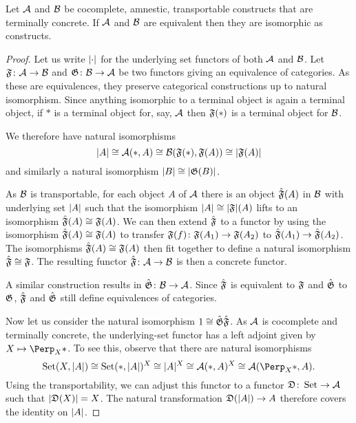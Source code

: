 \documentclass[%
12pt,%
arxiv,%
defaults
]{myclass}
\begin{document}
\begin{proposition}
Let \(\mathcal{A}\) and \(\mathcal{B}\) be cocomplete, amnestic, transportable constructs that are terminally concrete.
If \(\mathcal{A}\) and \(\mathcal{B}\) are equivalent then they are isomorphic as constructs.
\end{proposition}

\begin{proof}
Let us write \(\lvert \cdot \rvert\) for the underlying set functors of both \(\mathcal{A}\) and \(\mathcal{B}\).
Let \(\func{F} \colon \m{A} \to \m{B}\) and \(\func{G} \colon \m{B} \to \m{A}\) be two functors giving an equivalence of categories.
As these are equivalences, they preserve categorical constructions up to natural isomorphism.
Since anything isomorphic to a terminal object is again a terminal object, if \(*\) is a terminal object for, say, \(\mathcal{A}\) then \(\func{F}(*)\) is a terminal object for \(\mathcal{B}\).

We therefore have natural isomorphisms
%
\[
  \sabs{A} \cong \m{A}(*, A) \cong \m{B}(\func{F}(*), \func{F}(A)) \cong \sabs{\func{F}(A)}
\]
%
and similarly a natural isomorphism \(\sabs{B} \cong \sabs{\func{G}(B)}\).

As \(\mathcal{B}\) is transportable, for each object \(A\) of \(\mathcal{A}\) there is an object \(\hat{\func{F}}(A)\) in \(\mathcal{B}\) with underlying set \(\lvert A \rvert\) such that the isomorphism \(\sabs{A} \cong \sabs{\func{F}}(A)\) lifts to an isomorphism \(\hat{\func{F}}(A) \cong \func{F}(A)\).
We can then extend \(\hat{\func{F}}\) to a functor by using the isomorphism \(\hat{\func{F}}(A) \cong \func{F}(A)\) to transfer \(\func{F}(f) \colon \func{F}(A_1) \to \func{F}(A_2)\) to \(\hat{\func{F}}(A_1) \to \hat{\func{F}}(A_2)\).
The isomorphisms \(\hat{\func{F}}(A) \cong \func{F}(A)\) then fit together to define a natural isomorphism \(\hat{\func{F}} \cong \func{F}\).
The resulting functor \(\hat{\func{F}}\colon \m{A} \to \m{B}\) is then a concrete functor.

A similar construction results in \(\hat{\func{G}} \colon \m{B} \to \m{A}\).
Since \(\hat{\func{F}}\) is equivalent to \(\func{F}\) and \(\hat{\func{G}}\) to \(\func{G}\), \(\hat{\func{F}}\) and \(\hat{\func{G}}\) still define equivalences of categories.

Now let us consider the natural isomorphism \(1 \cong \hat{\func{G}}\hat{\func{F}}\).
As \(\mathcal{A}\) is cocomplete and terminally concrete, the underlying\hyp{}set functor has a left adjoint given by \(X \mapsto \scoprod_X *\).
To see this, observe that there are natural isomorphisms
%
\[
  \Set(X, \sabs{A}) \cong \Set(*, \sabs{A})^X \cong \sabs{A}^X \cong \m{A}(*, A)^X \cong \m{A}(\scoprod_X *, A).
\]
%
Using the transportability, we can adjust this functor to a functor \(\func{D} \colon \Set \to \m{A}\) such that \(\sabs{\func{D}(X)} = X\).
The natural transformation \(\func{D}(\sabs{A}) \to A\) therefore covers the identity on \(\lvert A \rvert\).


\end{proof}
\end{document}
